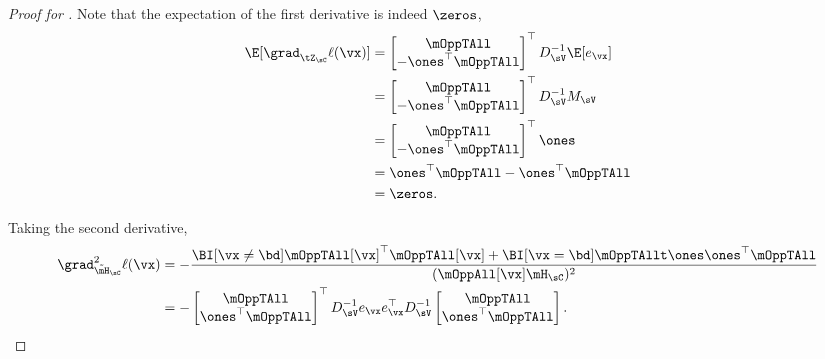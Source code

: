 \begin{proof}[Proof for ]
Note that the expectation of the first derivative is indeed $\zeros$,
\begin{align*}
  \E[\grad_{\tZ_\sC} \ell(\vx)]
  &= 
  \begin{bmatrix}
    \mOppTAll \\
    -\ones^\top \mOppTAll
  \end{bmatrix}^\top
  D_{\sV}^{-1} \E[e_\vx] \\
  &= 
  \begin{bmatrix}
    \mOppTAll \\
    -\ones^\top \mOppTAll
  \end{bmatrix}^\top
  D_{\sV}^{-1} M_\sV \\
  &= 
  \begin{bmatrix}
    \mOppTAll \\
    -\ones^\top \mOppTAll
  \end{bmatrix}^\top
  \ones \\
  &= \ones^\top\mOppTAll -\ones^\top \mOppTAll \\
  &= \zeros.
\end{align*}

Taking the second derivative,
\begin{align}
  \grad^2_{\tilde \mH_\sC} \ell(\vx)
  &= -\frac{\BI[\vx \neq \bd] \mOppTAll[\vx]^\top \mOppTAll[\vx] + \BI[\vx = \bd] \mOppTAllt \ones \ones^\top \mOppTAll}{(\mOppAll[\vx] \mH_\sC)^2} \nonumber \\
  &= - 
  \begin{bmatrix}
    \mOppTAll \\
    \ones^\top \mOppTAll
  \end{bmatrix}^\top
    D_{\sV}^{-1} e_\vx e_\vx^\top D_{\sV}^{-1} 
  \begin{bmatrix}
    \mOppTAll \\
    \ones^\top \mOppTAll
  \end{bmatrix}. \label{eqn:lhood-hess}%
\end{align}


\end{proof}
